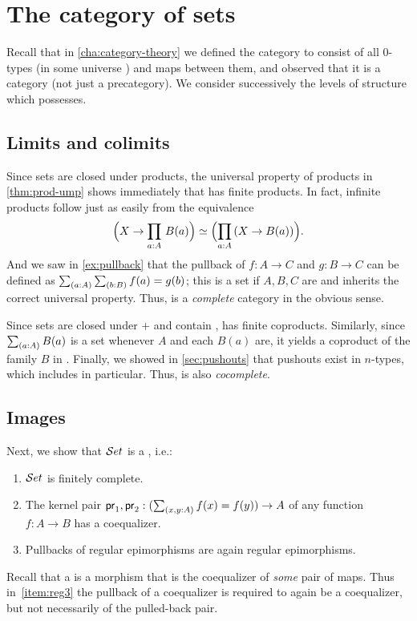 \section{The category of sets}
\label{sec:piw-pretopos}

Recall that in \autoref{cha:category-theory} we defined the category \uset to consist of all $0$-types (in some universe \UU) and maps between them, and observed that it is a category (not just a precategory).
We consider successively the levels of structure which \uset possesses.

\subsection{Limits and colimits}
\label{subsec:limits-sets}

Since sets are closed under products, the universal property of products in \autoref{thm:prod-ump} shows immediately that \uset has finite products.
In fact, infinite products follow just as easily from the equivalence
\[ \Parens{X\to \prd{a:A} B(a)} \eqvsym \Parens{\prd{a:A} (X\to B(a))}.\]
And we saw in \autoref{ex:pullback} that the pullback of $f:A\to C$ and $g:B\to C$ can be defined as $\sm{a:A}{b:B} f(a)=g(b)$; this is a set if $A,B,C$ are and inherits the correct universal property.
Thus, \uset is a \emph{complete} category in the obvious sense.

Since sets are closed under $+$ and contain \emptyt, \uset has finite coproducts.
Similarly, since $\sm{a:A}B(a)$ is a set whenever $A$ and each $B(a)$ are, it yields a coproduct of the family $B$ in \uset.
Finally, we showed in \autoref{sec:pushouts} that pushouts exist in $n$-types, which includes \uset in particular.
Thus, \uset is also \emph{cocomplete}.

\subsection{Images}
\label{sec:image}

Next, we show that $\mathcal{S}et$ is a , i.e.:
%
\begin{enumerate}
\item $\mathcal{S}et$ is finitely complete.\label{item:reg1}
\item The kernel pair $\proj1,\proj2: (\sm{x,y:A} f(x)= f(y)) \to A$ of any
      function $f : A \to B$ has a coequalizer.\label{item:reg2}
\item Pullbacks of regular epimorphisms are again regular epimorphisms.\label{item:reg3}
\end{enumerate}
%
Recall that a  is a morphism that is the coequalizer of \emph{some} pair of maps.
Thus in~\ref{item:reg3} the pullback of a coequalizer is required to again be a coequalizer, but not necessarily of the pulled-back pair.

